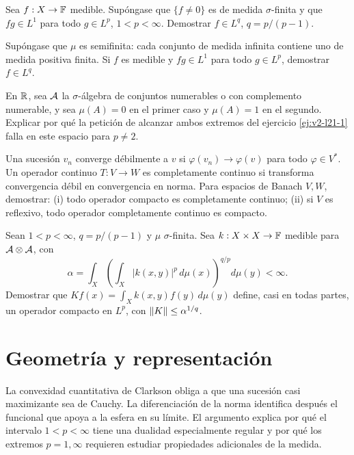 \begin{ejercicio}\label{ej:v2-l21-2}
Sea $f:X\to\mathbb F$ medible. Supóngase que $\{f\ne0\}$ es de medida $\sigma$-finita y que $fg\in L^1$ para todo $g\in L^p$, $1<p<\infty$. Demostrar $f\in L^q$, $q=p/(p-1)$.
\end{ejercicio}

\begin{ejercicio}\label{ej:v2-l21-3}
Supóngase que $\mu$ es semifinita: cada conjunto de medida infinita contiene uno de medida positiva finita. Si $f$ es medible y $fg\in L^1$ para todo $g\in L^p$, demostrar $f\in L^q$.
\end{ejercicio}

\begin{ejercicio}\label{ej:v2-l21-4}
En $\mathbb R$, sea $\mathcal A$ la $\sigma$-álgebra de conjuntos numerables o con complemento numerable, y sea $\mu(A)=0$ en el primer caso y $\mu(A)=1$ en el segundo. Explicar por qué la petición de alcanzar ambos extremos del ejercicio \ref{ej:v2-l21-1} falla en este espacio para $p\ne2$.
\end{ejercicio}

\begin{ejercicio}\label{ej:v2-l21-5}
Una sucesión $v_n$ converge débilmente a $v$ si $\varphi(v_n)\to\varphi(v)$ para todo $\varphi\in V^*$. Un operador continuo $T:V\to W$ es completamente continuo si transforma convergencia débil en convergencia en norma. Para espacios de Banach $V,W$, demostrar: (i) todo operador compacto es completamente continuo; (ii) si $V$ es reflexivo, todo operador completamente continuo es compacto.
\end{ejercicio}

\begin{ejercicio}\label{ej:v2-l21-6}
Sean $1<p<\infty$, $q=p/(p-1)$ y $\mu$ $\sigma$-finita. Sea $k:X\times X\to\mathbb F$ medible para $\mathcal A\otimes\mathcal A$, con
\[
 \alpha=\int_X\left(\int_X|k(x,y)|^p\,d\mu(x)\right)^{q/p}d\mu(y)<\infty.
\]
Demostrar que $Kf(x)=\int_Xk(x,y)f(y)\,d\mu(y)$ define, casi en todas partes, un operador compacto en $L^p$, con $\left\lVert K\right\rVert\le\alpha^{1/q}$.
\end{ejercicio}

\section{Geometría y representación}
La convexidad cuantitativa de Clarkson obliga a que una sucesión casi maximizante sea de Cauchy. La diferenciación de la norma identifica después el funcional que apoya a la esfera en su límite. El argumento explica por qué el intervalo $1<p<\infty$ tiene una dualidad especialmente regular y por qué los extremos $p=1,\infty$ requieren estudiar propiedades adicionales de la medida.
